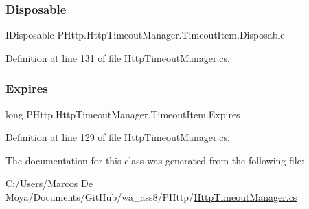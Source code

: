 \subsubsection{\texorpdfstring{Disposable}{Disposable}}
{\footnotesize\ttfamily I\+Disposable P\+Http.\+Http\+Timeout\+Manager.\+Timeout\+Item.\+Disposable\hspace{0.3cm}{\ttfamily [get]}}



Definition at line 131 of file Http\+Timeout\+Manager.\+cs.

\mbox{\label{class_p_http_1_1_http_timeout_manager_1_1_timeout_item_a2a2eeec9755d9593fcd9749072d02c8b}} 
\subsubsection{\texorpdfstring{Expires}{Expires}}
{\footnotesize\ttfamily long P\+Http.\+Http\+Timeout\+Manager.\+Timeout\+Item.\+Expires\hspace{0.3cm}{\ttfamily [get]}}



Definition at line 129 of file Http\+Timeout\+Manager.\+cs.



The documentation for this class was generated from the following file\+:\begin{DoxyCompactItemize}
\item 
C\+:/\+Users/\+Marcos De Moya/\+Documents/\+Git\+Hub/wa\+\_\+ass8/\+P\+Http/\hyperlink{_http_timeout_manager_8cs}{Http\+Timeout\+Manager.\+cs}\end{DoxyCompactItemize}
